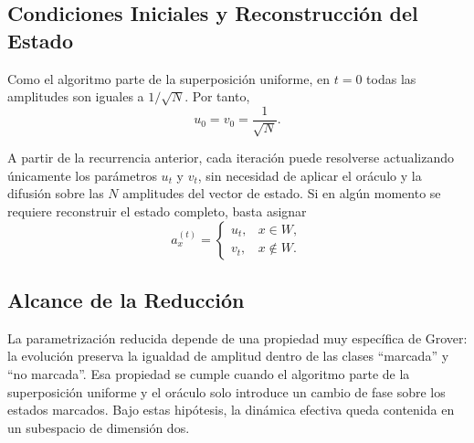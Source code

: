 \subsection*{Condiciones Iniciales y Reconstrucción del Estado}

Como el algoritmo parte de la superposición uniforme, en \(t=0\) todas las amplitudes son
iguales a \(1/\sqrt{N}\). Por tanto,
\[
u_0=v_0=\frac{1}{\sqrt{N}}.
\]

A partir de la recurrencia anterior, cada iteración puede resolverse actualizando únicamente
los parámetros \(u_t\) y \(v_t\), sin necesidad de aplicar el oráculo y la difusión sobre las
\(N\) amplitudes del vector de estado. Si en algún momento se requiere reconstruir el estado
completo, basta asignar
\[
a_x^{(t)}=
\begin{cases}
u_t, & x\in W,\\[4pt]
v_t, & x\notin W.
\end{cases}
\]

\subsection*{Alcance de la Reducción}

La parametrización reducida depende de una propiedad muy específica de Grover: la
evolución preserva la igualdad de amplitud dentro de las clases ``marcada'' y ``no marcada''.
Esa propiedad se cumple cuando el algoritmo parte de la superposición uniforme y el oráculo
solo introduce un cambio de fase sobre los estados marcados. Bajo estas hipótesis, la dinámica
efectiva queda contenida en un subespacio de dimensión dos.